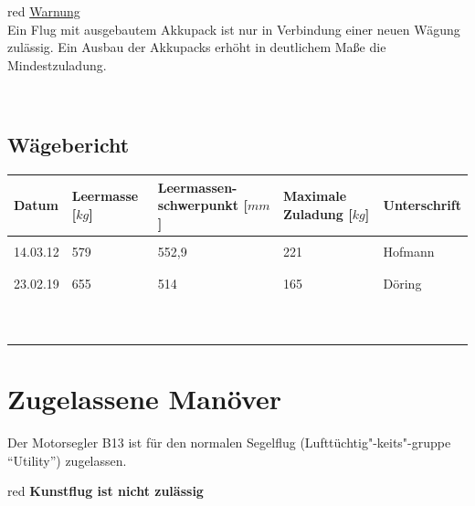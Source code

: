 \begin{color}{red}
\large{\underline{Warnung}}\\
Ein Flug mit ausgebautem Akkupack ist nur in Verbindung einer neuen Wägung zulässig. Ein Ausbau der Akkupacks erhöht in deutlichem Maße die Mindestzuladung.
\end{color}\\

\subsection{Wägebericht}

\begin{tiny}
\begin{tabular}{|m{}|m{}|m{2cm}|m{}|m{}|}
\hline
Datum & Leermasse [$\unit{kg}$] & Leermassen- schwerpunkt [$\unit{mm}$]  & Maximale Zuladung [$\unit{kg}$] & Unterschrift\\

\hline
& & & &\\
14.03.12 & 579 & 552,9 & 221 & Hofmann\\
& & & &\\
\hline
& & & &\\
23.02.19 & 655 & 514 & 165 & Döring\\
& & & &\\
\hline
& & & &\\
& & & &\\
& & & &\\
\hline
& & & &\\
& & & &\\
& & & &\\
\hline
& & & &\\
& & & &\\
& & & &\\
\hline

\end{tabular}
\end{tiny}


\section{Zugelassene Manöver}
Der Motorsegler B13 ist für den normalen Segelflug (Lufttüchtig"-keits"-gruppe "`Utility"') zugelassen.\\
\newline
\begin{color}{red}
\textbf{Kunstflug ist nicht zulässig}
\end{color}

